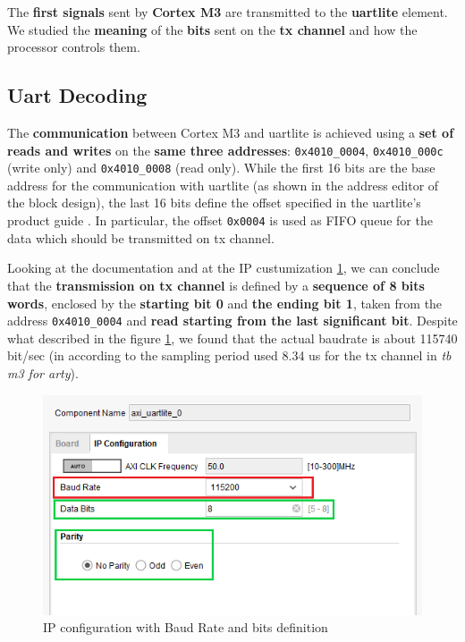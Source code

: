 
The {\bf first signals} sent by {\bf Cortex M3} are transmitted to the {\bf uartlite} element. We studied the {\bf meaning} of the {\bf bits} sent on the {\bf tx channel} and how the processor controls them.
\newline
{\color{Blue}\subsection{Uart Decoding}}

The {\bf communication} between Cortex M3 and uartlite is achieved using a {\bf set of reads and writes} on the {\bf same three addresses}: \verb+0x4010_0004+, \verb+0x4010_000c+ (write only) and \verb+0x4010_0008+ (read only).
While the first 16 bits are the base address for the communication with uartlite (as shown in the address editor of the block design), the last 16 bits define the offset specified in the uartlite's product guide \cite[Chapter2.Register Space]{AXIUartguide}. In particular, the offset \verb+0x0004+ is used as FIFO queue for the data which should be transmitted on tx channel.
\newline

Looking at the documentation \cite{UartBasics} and at the IP custumization \ref{ip_config}, we can conclude that the {\bf transmission on tx channel} is defined by a {\bf sequence of 8 bits words}, enclosed by the {\bf starting bit 0} and {\bf the ending bit 1}, taken from the address \verb+0x4010_0004+ and {\bf read starting from the last significant bit}. Despite what described in the figure \ref{ip_config}, we found that the actual baudrate is about 115740 bit/sec (in according to the sampling period used 8.34 us for the tx channel in \textit{tb m3 for arty}).

\begin{figure}[hb]
  \includegraphics{./../../img/Images/uartlite_ip_configuration_col}
  \caption{IP configuration with {\color{Red}Baud Rate} and {\color{Green} bits} definition}
  \label{ip_config}
\end{figure}

